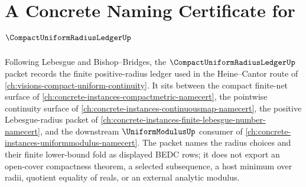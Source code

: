 \chapter{A Concrete Naming Certificate for $\CompactUniformRadiusLedgerUp$}
\label{ch:concrete-instances-compact-uniform-radius-ledger-namecert}

Following Lebesgue and Bishop--Bridges, the $\CompactUniformRadiusLedgerUp$ packet records the finite positive-radius ledger used in the Heine--Cantor route of \autoref{ch:visions-compact-uniform-continuity}. It sits between the compact finite-net surface of \autoref{ch:concrete-instances-compactmetric-namecert}, the pointwise continuity surface of \autoref{ch:concrete-instances-continuousmap-namecert}, the positive Lebesgue-radius packet of \autoref{ch:concrete-instances-finite-lebesgue-number-namecert}, and the downstream $\UniformModulusUp$ consumer of \autoref{ch:concrete-instances-uniformmodulus-namecert}. The packet names the radius choices and their finite lower-bound fold as displayed BEDC rows; it does not export an open-cover compactness theorem, a selected subsequence, a host minimum over radii, quotient equality of reals, or an external analytic modulus.


